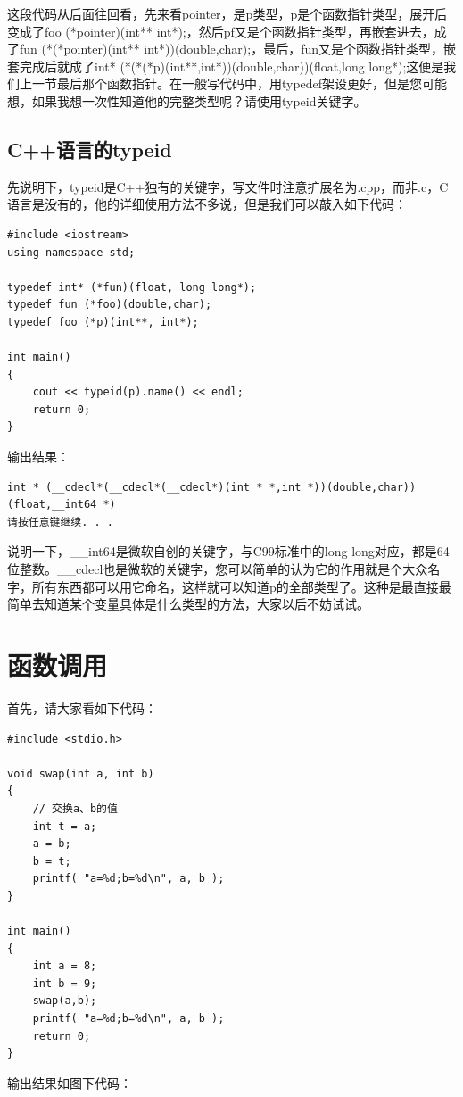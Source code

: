 \documentclass[11pt,twoside,a4paper,titlepage]{article}	%
\begin{document}
这段代码从后面往回看，先来看pointer，是p类型，p是个函数指针类型，展开后变成了foo (*pointer)(int** int*);，然后pf又是个函数指针类型，再嵌套进去，成了fun (*(*pointer)(int** int*))(double,char);，最后，fun又是个函数指针类型，嵌套完成后就成了int* (*(*(*p)(int**,int*))(double,char))(float,long long*);这便是我们上一节最后那个函数指针。在一般写代码中，用typedef架设更好，但是您可能想，如果我想一次性知道他的完整类型呢？请使用typeid关键字。

\subsection{C++语言的typeid}
先说明下，{\color{red}typeid是C++独有的关键字，写文件时注意扩展名为.cpp，而非.c}，C语言是没有的，他的详细使用方法不多说，但是我们可以敲入如下代码：

\begin{lstlisting}
#include <iostream>
using namespace std;

typedef int* (*fun)(float, long long*);
typedef fun (*foo)(double,char);
typedef foo (*p)(int**, int*);

int main()
{
	cout << typeid(p).name() << endl;
	return 0;
}
\end{lstlisting}

输出结果：
\begin{lstlisting}
int * (__cdecl*(__cdecl*(__cdecl*)(int * *,int *))(double,char))(float,__int64 *)
请按任意键继续. . .
\end{lstlisting}

说明一下，\_\_int64是微软自创的关键字，与C99标准中的long long对应，都是64位整数。\_\_cdecl也是微软的关键字，您可以简单的认为它的作用就是个大众名字，所有东西都可以用它命名，这样就可以知道p的全部类型了。这种是最直接最简单去知道某个变量具体是什么类型的方法，大家以后不妨试试。

\newpage
\section{函数调用}
首先，请大家看如下代码：
\begin{lstlisting}
#include <stdio.h>

void swap(int a, int b)
{
	// 交换a、b的值
	int t = a;
	a = b;
	b = t;
	printf( "a=%d;b=%d\n", a, b );
}

int main()
{
	int a = 8;
	int b = 9;
	swap(a,b);
	printf( "a=%d;b=%d\n", a, b );
	return 0;
}
\end{lstlisting}

输出结果如图下代码：
\end{document}
